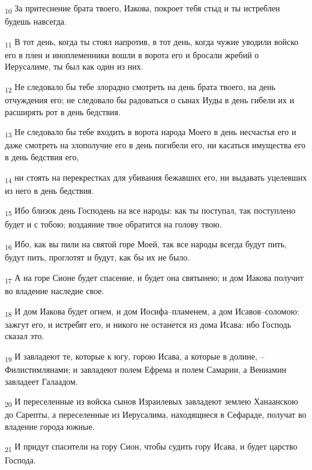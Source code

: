 \begin{tcolorbox}
\textsubscript{10} За притеснение брата твоего, Иакова, покроет тебя стыд и ты истреблен будешь навсегда.
\end{tcolorbox}
\begin{tcolorbox}
\textsubscript{11} В тот день, когда ты стоял напротив, в тот день, когда чужие уводили войско его в плен и иноплеменники вошли в ворота его и бросали жребий о Иерусалиме, ты был как один из них.
\end{tcolorbox}
\begin{tcolorbox}
\textsubscript{12} Не следовало бы тебе злорадно смотреть на день брата твоего, на день отчуждения его; не следовало бы радоваться о сынах Иуды в день гибели их и расширять рот в день бедствия.
\end{tcolorbox}
\begin{tcolorbox}
\textsubscript{13} Не следовало бы тебе входить в ворота народа Моего в день несчастья его и даже смотреть на злополучие его в день погибели его, ни касаться имущества его в день бедствия его,
\end{tcolorbox}
\begin{tcolorbox}
\textsubscript{14} ни стоять на перекрестках для убивания бежавших его, ни выдавать уцелевших из него в день бедствия.
\end{tcolorbox}
\begin{tcolorbox}
\textsubscript{15} Ибо близок день Господень на все народы: как ты поступал, так поступлено будет и с тобою; воздаяние твое обратится на голову твою.
\end{tcolorbox}
\begin{tcolorbox}
\textsubscript{16} Ибо, как вы пили на святой горе Моей, так все народы всегда будут пить, будут пить, проглотят и будут, как бы их не было.
\end{tcolorbox}
\begin{tcolorbox}
\textsubscript{17} А на горе Сионе будет спасение, и будет она святынею; и дом Иакова получит во владение наследие свое.
\end{tcolorbox}
\begin{tcolorbox}
\textsubscript{18} И дом Иакова будет огнем, и дом Иосифа--пламенем, а дом Исавов--соломою: зажгут его, и истребят его, и никого не останется из дома Исава: ибо Господь сказал это.
\end{tcolorbox}
\begin{tcolorbox}
\textsubscript{19} И завладеют те, которые к югу, горою Исава, а которые в долине, --Филистимлянами; и завладеют полем Ефрема и полем Самарии, а Вениамин завладеет Галаадом.
\end{tcolorbox}
\begin{tcolorbox}
\textsubscript{20} И переселенные из войска сынов Израилевых завладеют землею Ханаанскою до Сарепты, а переселенные из Иерусалима, находящиеся в Сефараде, получат во владение города южные.
\end{tcolorbox}
\begin{tcolorbox}
\textsubscript{21} И придут спасители на гору Сион, чтобы судить гору Исава, и будет царство Господа.
\end{tcolorbox}
